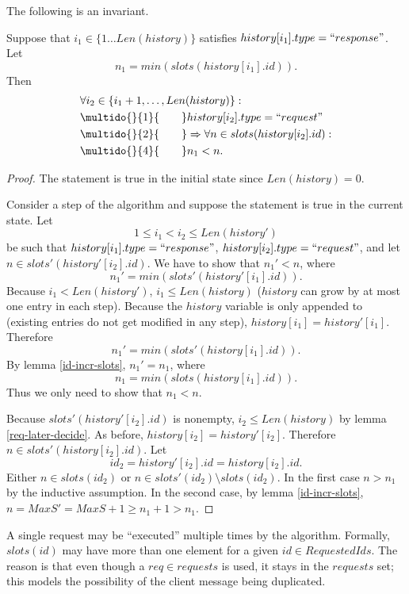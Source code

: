\documentclass[12pt,a4paper,en]{pracamgr}
\newcommand{\ind}[1]{\multido{}{#1}{\qquad}}
\begin{document}
\begin{lemma}\label{resp-req-ord}
    The following is an invariant.

    Suppose that $i_1 \in \{1 \dots Len(history)\}$ satisfies $history[i_1].type = ``response"$. Let
    $$ n_1 = min(slots(history[i_1].id)). $$
    Then
    \begin{align*}
        & \forall i_2 \in \{i_1 + 1, \dots, Len(history)\}:\\
        & \ind{1} history[i_2].type = ``request"\\
        & \ind{2} \Rightarrow \forall n \in slots(history[i_2].id):\\
        & \ind{4} n_1 < n.
    \end{align*}
\end{lemma}
\begin{proof}
    The statement is true in the initial state since $Len(history) = 0$.

    Consider a step of the algorithm and suppose the statement is true in the current state. Let
    $$ 1 \le i_1 < i_2 \le Len(history') $$
    be such that $history[i_1].type = ``response"$, $history[i_2].type = ``request"$, and let $n \in slots'(history'[i_2].id)$. We have to show that $n_1' < n$, where
    $$ n_1' = min(slots'(history'[i_1].id)). $$
    Because $i_1 < Len(history')$, $i_1 \le Len(history)$ ($history$ can grow by at most one entry in each step). Because the $history$ variable is only appended to (existing entries do not get modified in any step), $history[i_1] = history'[i_1]$. Therefore
    $$ n_1' = min(slots'(history[i_1].id)). $$
    By lemma \ref{id-incr-slots}, $n_1' = n_1$, where
    $$ n_1 = min(slots(history[i_1].id)). $$
    Thus we only need to show that $n_1 < n$.

    Because $slots'(history'[i_2].id)$ is nonempty, $i_2 \le Len(history)$ by lemma \ref{req-later-decide}. As before, $history[i_2] = history'[i_2]$. Therefore $n \in slots'(history[i_2].id)$. Let
    $$id_2 = history'[i_2].id = history[i_2].id. $$
    Either $n \in slots(id_2)$ or $n \in slots'(id_2) \setminus slots(id_2)$. In the first case $n > n_1$ by the inductive assumption. In the second case, by lemma \ref{id-incr-slots}, $n = MaxS' = MaxS + 1 \ge n_1 + 1 > n_1$.
\end{proof}

A single request may be ``executed'' multiple times by the algorithm. Formally, $slots(id)$ may have more than one element for a given $id \in RequestedIds$. The reason is that even though a $req \in requests$ is used, it stays in the $requests$ set; this models the possibility of the client message being duplicated.
\end{document}
